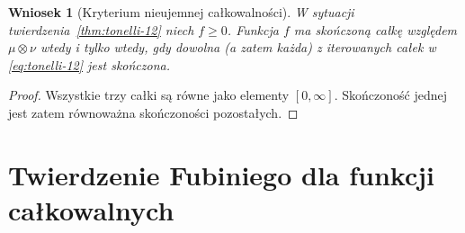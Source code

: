 \documentclass[11pt,a4paper,oneside]{book}
\numberwithin{equation}{chapter}
\theoremstyle{plain}
\newtheorem{wniosek}[twierdzenie]{Wniosek}
\theoremstyle{definition}
\theoremstyle{remark}
\begin{document}
\begin{wniosek}[Kryterium nieujemnej całkowalności]
\label{cor:tonelli-integrability-12}
W sytuacji twierdzenia~\ref{thm:tonelli-12}
niech $f\ge0$. Funkcja $f$ ma skończoną całkę
względem $\mu\otimes\nu$ wtedy i tylko wtedy,
gdy dowolna (a zatem każda) z iterowanych całek
w \eqref{eq:tonelli-12} jest skończona.
\end{wniosek}
\begin{proof}
Wszystkie trzy całki są równe jako elementy
$[0,\infty]$. Skończoność jednej jest zatem
równoważna skończoności pozostałych.
\end{proof}

\section{Twierdzenie Fubiniego dla funkcji całkowalnych}
\end{document}
